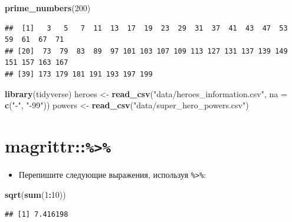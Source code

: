 \documentclass[]{book}
\newenvironment{Shaded}{\begin{snugshade}}{\end{snugshade}}
\newcommand{\KeywordTok}[1]{\textcolor[rgb]{0.13,0.29,0.53}{\textbf{#1}}}
\newcommand{\DataTypeTok}[1]{\textcolor[rgb]{0.13,0.29,0.53}{#1}}
\newcommand{\DecValTok}[1]{\textcolor[rgb]{0.00,0.00,0.81}{#1}}
\newcommand{\StringTok}[1]{\textcolor[rgb]{0.31,0.60,0.02}{#1}}
\newcommand{\OperatorTok}[1]{\textcolor[rgb]{0.81,0.36,0.00}{\textbf{#1}}}
\newcommand{\NormalTok}[1]{#1}
\providecommand{\tightlist}{%
  \setlength{\itemsep}{0pt}\setlength{\parskip}{0pt}}
\begin{document}
\begin{Shaded}
\begin{Highlighting}[]
\KeywordTok{prime_numbers}\NormalTok{(}\DecValTok{200}\NormalTok{)}
\end{Highlighting}
\end{Shaded}

\begin{verbatim}
##  [1]   3   5   7  11  13  17  19  23  29  31  37  41  43  47  53  59  61  67  71
## [20]  73  79  83  89  97 101 103 107 109 113 127 131 137 139 149 151 157 163 167
## [39] 173 179 181 191 193 197 199
\end{verbatim}

\begin{Shaded}
\begin{Highlighting}[]
\KeywordTok{library}\NormalTok{(tidyverse)}
\NormalTok{heroes <-}\StringTok{ }\KeywordTok{read_csv}\NormalTok{(}\StringTok{"data/heroes_information.csv"}\NormalTok{,}
                   \DataTypeTok{na =} \KeywordTok{c}\NormalTok{(}\StringTok{"-"}\NormalTok{, }\StringTok{"-99"}\NormalTok{))}
\NormalTok{powers <-}\StringTok{ }\KeywordTok{read_csv}\NormalTok{(}\StringTok{"data/super_hero_powers.csv"}\NormalTok{)}
\end{Highlighting}
\end{Shaded}

\section{\texorpdfstring{magrittr::\texttt{\%\textgreater{}\%}}{magrittr::\%\textgreater{}\%}}\label{solution_pipe}

\begin{itemize}
\tightlist
\item
  Перепишите следующие выражения, используя \texttt{\%\textgreater{}\%}:
\end{itemize}

\begin{Shaded}
\begin{Highlighting}[]
\KeywordTok{sqrt}\NormalTok{(}\KeywordTok{sum}\NormalTok{(}\DecValTok{1}\OperatorTok{:}\DecValTok{10}\NormalTok{))}
\end{Highlighting}
\end{Shaded}

\begin{verbatim}
## [1] 7.416198
\end{verbatim}

\begin{Shaded}
\end{Shaded}
\end{document}
